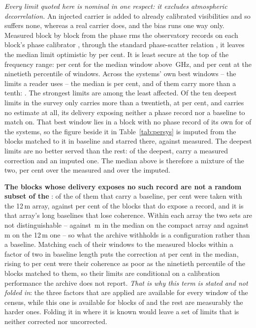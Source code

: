 \emph{Every limit quoted here is nominal in one respect: it excludes
atmospheric decorrelation.} An injected carrier is added to already
calibrated visibilities and so suffers none, whereas a real carrier does, and
the bias runs one way only. Measured block by block from the phase rms the
observatory records on each block's phase calibrator
\citep[\S\S10.4.11, 11.3.1]{ALMAHandbook}, through the standard phase-scatter
relation \citep[Eq.~3]{Richards2022}, it leaves the median limit optimistic
by \SensDecorPct{} per cent. It is least secure at the top of the frequency
range: \SensDecorHiPct{} per cent for the median window above
\SensDecorHiGHz\,GHz, and \NmDecHiPct{} per cent at the ninetieth percentile
of windows. Across the systems' own best windows -- the limits a reader uses
-- the median is \NmDecSysMedPct{} per cent, and \NmDecNBigSys{} of them
carry more than a tenth: \NmDecBigSys. The strongest limits are among the
least affected. Of the ten deepest limits in the survey only
\NmDecDeepBigSys{} carries more than a twentieth, at \NmDecDeepBigPct{} per
cent, and \NmDecNoRecSys{} carries no estimate at all, its delivery exposing
neither a phase record nor a baseline to match on.
That best window lies in a block with no phase record of its own for
\NgNDecImpSys{} of the \NSysClassA{} systems, so the figure beside it in
Table~\ref{tab:persys} is imputed from the blocks matched to it in baseline
and starred there, against \NgNDecMeasSys{} measured. The deepest limits are
no better served than the rest: of the \NgNDeep{} deepest, \NgNDeepMeas{}
carry a measured correction and \NgNDeepImp{} an imputed one. The median
above is therefore a mixture of the two, \NgDecMeasMedPct{} per cent over the
measured and \NgDecImpMedPct{} over the imputed.

\textbf{The \RpDecNUn{} blocks whose delivery exposes no such record are not
a random subset of the \SensDecorNBlkTot}: of the \NbDecNUnBl{} of them that
carry a baseline, \NbDecPctTwelveUn{} per cent were taken with the 12\,m
array, against \NbDecPctTwelveMeas{} per cent of the blocks that do expose a
record, and it is that array's long baselines that lose coherence.
Within each array the two sets are not distinguishable --
\NbDecBlSevenUn{} against \NbDecBlSevenMeas\,m in the median on the compact
array and \NbDecBlTwelveUn{} against \NbDecBlTwelveMeas\,m on the 12\,m one
-- so what the archive withholds is a configuration rather than a baseline.
Matching each of their windows
to the measured blocks within a factor of two in baseline length puts the
correction at \RpDecMatchMed{} per cent in the median, rising to
\RpDecMatchHi{} per cent were their coherence as poor as the ninetieth
percentile of the blocks matched to them, so their limits are conditional on
a calibration performance the archive does not report. \emph{That is why this
term is stated and not folded in}: the three factors that are applied are
available for every window of the census, while this one is available for
\SensDecorNBlk{} blocks of \SensDecorNBlkTot{} and the rest are measurably
the harder ones. Folding it in where it is known would leave a set of limits
that is neither corrected nor uncorrected.

